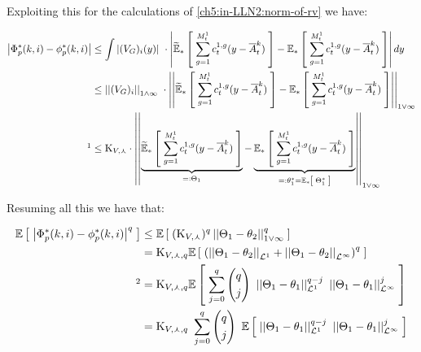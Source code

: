 	Exploiting this for the calculations of \ref{ch5:in-LLN2:norm-of-rv} we have:
	
	\begin{equation}
		\label{ch5:in-LLN2:bound-for-norm-of-rv}
		\begin{aligned}
			\norm{
				\Phi_p^\ast(k,i) - \phi_p^\ast(k,i)
			}&\leq
			\int
			\norm{(\genAttraction)_i (y)}\
			\cdot
			\norm{
				\ETFoot{\ast}{
					\sum _{g = 1}^{\hmactive_t^1}
					\cdens_t^{1,g}
					(y - \mfamba_t^k)
				}
				-
				\EFoot
				{\ast}{
					\sum _{g = 1}^{\hmactive_t^1}
					\cdens_t^{1,g}
					(y - \mfamba_t^k)
				}
			}
			dy
			\\
			&\leq
			\Norm{(\genAttraction)_i }_{1 \wedge \infty}\
			\cdot
			\Norm{
				\ETFoot{\ast}{
					\sum _{g = 1}^{\hmactive_t^1}
					\cdens_t^{1,g}
					(y - \mfamba_t^k)
				}
				-
				\EFoot
				{\ast}{
					\sum _{g = 1}^{\hmactive_t^1}
					\cdens_t^{1,g}
					(y - \mfamba_t^k)
				}
			}_{1 \vee \infty}
			\\
			\footnotemark[1] &\leq
			\const_{\attraction,\curlywedge}
			\cdot
			\Norm{
				\underbrace{
					\ETFoot{\ast}{
						\sum _{g = 1}^{\hmactive_t^1}
						\cdens_t^{1,g}
						(y - \mfamba_t^k)
					}
				}_{=:\Theta_1}
				-
				\underbrace{
					\EFoot
					{\ast}{
						\sum _{g = 1}^{\hmactive_t^1}
						\cdens_t^{1,g}
						(y - \mfamba_t^k)
					}
				}_{=:\theta_1^\ast = \EFoot{\ast}{\Theta_1^\ast}}
			}_{1 \vee \infty}
		\end{aligned}
	\end{equation}
	\footnotetext[1]{\ref{ch5:lemma:eval-norm-gen-attr}}
	
	Resuming all this we have that:
	
	\begin{align*}
		\E{
			\norm{
				\Phi_p^\ast(k,i) - \phi_p^\ast(k,i)
			}^q
		}
		&\leq
		\E{
			(\const_{\attraction,\curlywedge})^q
			\Norm{
				\Theta_1 - \theta_2
			}_{1 \vee \infty}^q
		}		
		\\
		&=
		\const_{\attraction,\curlywedge,q}
		\E{
			\left(
			\Norm{
				\Theta_1 - \theta_2
			}_{\Lpspace^1}
			+
			\Norm{
				\Theta_1 - \theta_2
			}_{\Lpspace^\infty}
			\right)^q
		}
		\\
		\footnotemark[2] &=
		\const_{\attraction,\curlywedge,q}
		\E{
			\sum_{j=0}^{q}
			\left(
			\begin{gathered}
				q
				\\
				j
			\end{gathered}
			\right)\
			\Norm{
				\Theta_1 - \theta_1
			}_{\Lpspace^1}^{q-j}\
			\Norm{
				\Theta_1 - \theta_1
			}_{\Lpspace^\infty}^{j}
		}
		\\
		&=
		\const_{\attraction,\curlywedge,q}\
		\sum_{j=0}^{q}
		\left(
		\begin{gathered}
			q
			\\
			j
		\end{gathered}
		\right)\
		\E{
			\Norm{
				\Theta_1 - \theta_1
			}_{\Lpspace^1}^{q-j}\
			\Norm{
				\Theta_1 - \theta_1
			}_{\Lpspace^\infty}^{j}
		}
	\end{align*}
	
